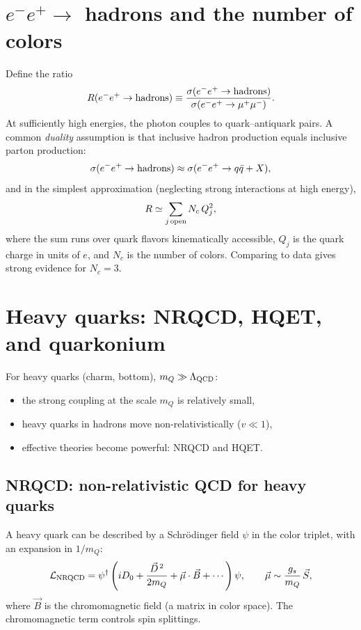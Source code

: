 \section{$e^-e^+\to$ hadrons and the number of colors}
Define the ratio
\begin{equation}
R(e^-e^+\to{\rm hadrons}) \equiv
\frac{\sigma(e^-e^+\to{\rm hadrons})}{\sigma(e^-e^+\to\mu^+\mu^-)}.
\end{equation}
At sufficiently high energies, the photon couples to quark--antiquark pairs.
A common \emph{duality} assumption is that inclusive hadron production equals inclusive
parton production:
\[
\sigma(e^-e^+\to{\rm hadrons}) \approx \sigma(e^-e^+\to q\bar q + X),
\]
and in the simplest approximation (neglecting strong interactions at high energy),
\begin{equation}
R \simeq \sum_{j\,{\rm open}} N_c\,Q_j^2,
\end{equation}
where the sum runs over quark flavors kinematically accessible, $Q_j$ is the quark charge
in units of $e$, and $N_c$ is the number of colors. Comparing to data gives strong evidence
for $N_c=3$.

\section{Heavy quarks: NRQCD, HQET, and quarkonium}
For heavy quarks (charm, bottom), $m_Q \gg \Lambda_{\rm QCD}$:
\begin{itemize}
  \item the strong coupling at the scale $m_Q$ is relatively small,
  \item heavy quarks in hadrons move non-relativistically ($v\ll 1$),
  \item effective theories become powerful: NRQCD and HQET.
\end{itemize}

\subsection{NRQCD: non-relativistic QCD for heavy quarks}
A heavy quark can be described by a Schr\"odinger field $\psi$ in the color triplet,
with an expansion in $1/m_Q$:
\begin{equation}
\mathcal L_{\rm NRQCD}
= \psi^\dagger\left(
iD_0 + \frac{\vec D^{\,2}}{2m_Q} + \vec\mu\cdot \vec B + \cdots
\right)\psi,
\qquad \vec\mu \sim \frac{g_s}{m_Q}\,\vec S,
\end{equation}
where $\vec B$ is the chromomagnetic field (a matrix in color space).
The chromomagnetic term controls spin splittings.

